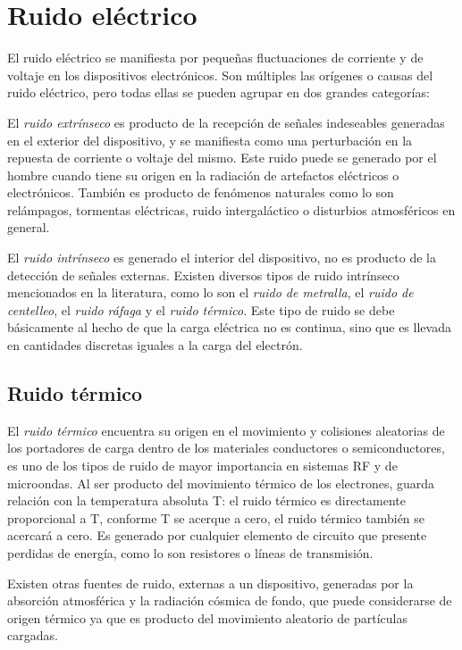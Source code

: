 \documentclass{article}
\begin{document}
	
	\section{Ruido eléctrico}
		El ruido eléctrico se manifiesta por pequeñas fluctuaciones de corriente y de voltaje en los dispositivos electrónicos. Son múltiples las orígenes o causas del ruido eléctrico, pero todas ellas se pueden agrupar en dos grandes categorías:	
	
		El \emph{ruido extrínseco} es producto de la recepción de señales indeseables generadas en el exterior del dispositivo, y se manifiesta como una perturbación en la repuesta de corriente o voltaje del mismo. Este ruido puede se generado por el hombre cuando tiene su origen en la radiación de artefactos eléctricos o electrónicos. También es producto de fenómenos naturales como lo son relámpagos, tormentas eléctricas, ruido intergaláctico o disturbios atmosféricos en general.
		
		El \emph{ruido intrínseco} es generado el interior del dispositivo, no es producto de la detección de señales externas. Existen diversos tipos de ruido intrínseco mencionados en la literatura, como lo son el \emph{ruido de metralla}, el \emph{ruido de centelleo}, el \emph{ruido ráfaga} y el \emph{ruido térmico}. Este tipo de ruido se debe básicamente al hecho de que la carga eléctrica no es continua, sino que es llevada en cantidades discretas iguales a la carga del electrón.
			
	\subsection{Ruido térmico}
		
		El \emph{ruido térmico} encuentra su origen en el movimiento y colisiones aleatorias de los portadores de carga dentro de los materiales conductores o semiconductores, es uno de los tipos de ruido de mayor importancia en sistemas RF y de microondas. Al ser producto del movimiento térmico de los electrones, guarda relación con la temperatura absoluta T: el ruido térmico es directamente proporcional a T, conforme T se acerque a cero, el ruido térmico también se acercará a cero. Es generado por cualquier elemento de circuito que presente perdidas de energía, como lo son resistores o líneas de transmisión. 
		
		Existen otras fuentes de ruido, externas a un dispositivo, generadas por la absorción atmosférica y la radiación cósmica de fondo, que puede considerarse de origen térmico ya que es producto del movimiento aleatorio de partículas cargadas.
		
\end{document}
